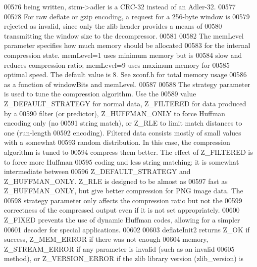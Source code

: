 \begin{DoxyCode}
00576 \textcolor{comment}{   being written, strm->adler is a CRC-32 instead of an Adler-32.}
00577 \textcolor{comment}{}
00578 \textcolor{comment}{     For raw deflate or gzip encoding, a request for a 256-byte window is}
00579 \textcolor{comment}{   rejected as invalid, since only the zlib header provides a means of}
00580 \textcolor{comment}{   transmitting the window size to the decompressor.}
00581 \textcolor{comment}{}
00582 \textcolor{comment}{     The memLevel parameter specifies how much memory should be allocated}
00583 \textcolor{comment}{   for the internal compression state.  memLevel=1 uses minimum memory but is}
00584 \textcolor{comment}{   slow and reduces compression ratio; memLevel=9 uses maximum memory for}
00585 \textcolor{comment}{   optimal speed.  The default value is 8.  See zconf.h for total memory usage}
00586 \textcolor{comment}{   as a function of windowBits and memLevel.}
00587 \textcolor{comment}{}
00588 \textcolor{comment}{     The strategy parameter is used to tune the compression algorithm.  Use the}
00589 \textcolor{comment}{   value Z\_DEFAULT\_STRATEGY for normal data, Z\_FILTERED for data produced by a}
00590 \textcolor{comment}{   filter (or predictor), Z\_HUFFMAN\_ONLY to force Huffman encoding only (no}
00591 \textcolor{comment}{   string match), or Z\_RLE to limit match distances to one (run-length}
00592 \textcolor{comment}{   encoding).  Filtered data consists mostly of small values with a somewhat}
00593 \textcolor{comment}{   random distribution.  In this case, the compression algorithm is tuned to}
00594 \textcolor{comment}{   compress them better.  The effect of Z\_FILTERED is to force more Huffman}
00595 \textcolor{comment}{   coding and less string matching; it is somewhat intermediate between}
00596 \textcolor{comment}{   Z\_DEFAULT\_STRATEGY and Z\_HUFFMAN\_ONLY.  Z\_RLE is designed to be almost as}
00597 \textcolor{comment}{   fast as Z\_HUFFMAN\_ONLY, but give better compression for PNG image data.  The}
00598 \textcolor{comment}{   strategy parameter only affects the compression ratio but not the}
00599 \textcolor{comment}{   correctness of the compressed output even if it is not set appropriately.}
00600 \textcolor{comment}{   Z\_FIXED prevents the use of dynamic Huffman codes, allowing for a simpler}
00601 \textcolor{comment}{   decoder for special applications.}
00602 \textcolor{comment}{}
00603 \textcolor{comment}{     deflateInit2 returns Z\_OK if success, Z\_MEM\_ERROR if there was not enough}
00604 \textcolor{comment}{   memory, Z\_STREAM\_ERROR if any parameter is invalid (such as an invalid}
00605 \textcolor{comment}{   method), or Z\_VERSION\_ERROR if the zlib library version (zlib\_version) is}

\end{DoxyCode}
